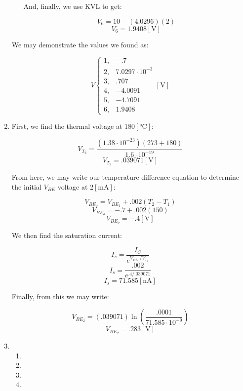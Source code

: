\begin{enumerate}
\begin{itemize}
        And, finally, we use KVL to get:

        $$V_6=10-(4.0296)(2)$$
        $$\boxed{V_6=1.9408[\si{\volt}]}$$

    \end{itemize}

    We may demonstrate the values we found as:

    $$\boxed{V\left\{\begin{array}{ll} 1,& -.7\\2,&7.0297\cdot10^{-3}\\3,&.707\\4,&-4.0091\\5,&-4.7091\\6,&1.9408\end{array}[\si{\volt}]}$$

  \item

    First, we find the thermal voltage at $180[\si{\celsius}]$:

    $$V_{T_2}=\frac{\left( 1.38\cdot10^{-23} \right)(273+180)}{1.6\cdot10^{-19}}$$
    $$V_{T_2}=.039071[\si{\volt}]$$

    From here, we may write our temperature difference equation to determine the initial $V_{BE}$ voltage at $2[\si{\milli\ampere}]$:

    $$V_{BE_o}=V_{BE_1}+.002(T_2-T_1)$$
    $$V_{BE_o}=-.7+.002(150)$$
    $$V_{BE_o}=-.4[\si{\volt}]$$

    We then find the saturation current:

    $$I_s=\frac{I_C}{e^{V_{BE_o}/V_{T_2}}}$$
    $$I_s=\frac{.002}{e^{.4/.039071}}$$
    $$I_s=71.585[\si{\nano\ampere}]$$

    Finally, from this we may write:

    $$V_{BE_2}=(.039071)\ln\left( \frac{.0001}{71.585\cdot10^{-9}} \right)$$
    $$\boxed{V_{BE_2}=.283[\si{\volt}]}$$

  \item

    \begin{enumerate}

      \item 

      \item 

      \item 

      \item 

    \end{enumerate}

\end{enumerate}



